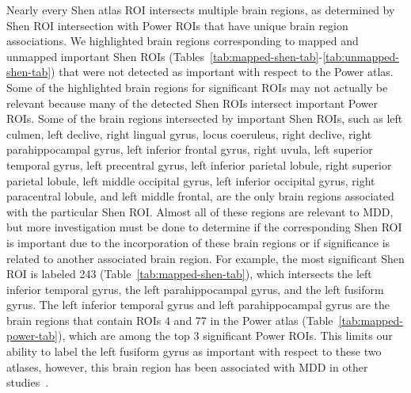 \documentclass[10pt,letterpaper]{article}\usepackage[]{graphicx}\usepackage[]{color}
\begin{document}
Nearly every Shen atlas ROI intersects multiple brain regions, as determined by Shen ROI intersection with Power ROIs that have unique brain region associations. We highlighted brain regions corresponding to mapped and unmapped important Shen ROIs (Tables~\ref{tab:mapped-shen-tab}-\ref{tab:unmapped-shen-tab}) that were not detected as important with respect to the Power atlas. Some of the highlighted brain regions for significant ROIs may not actually be relevant because many of the detected Shen ROIs intersect important Power ROIs. Some of the brain regions intersected by important Shen ROIs, such as left culmen, left declive, right lingual gyrus, locus coeruleus, right declive, right parahippocampal gyrus, left inferior frontal gyrus, right uvula, left superior temporal gyrus, left precentral gyrus, left inferior parietal lobule, right superior parietal lobule, left middle occipital gyrus, left inferior occipital gyrus, right paracentral lobule, and left middle frontal, are the only brain regions associated with the particular Shen ROI. Almost all of these regions are relevant to MDD, but more investigation must be done to determine if the corresponding Shen ROI is important due to the incorporation of these brain regions or if significance is related to another associated brain region. For example, the most significant Shen ROI is labeled 243 (Table~\ref{tab:mapped-shen-tab}), which intersects the left inferior temporal gyrus, the left parahippocampal gyrus, and the left fusiform gyrus. The left inferior temporal gyrus and left parahippocampal gyrus are the brain regions that contain ROIs 4 and 77 in the Power atlas (Table~\ref{tab:mapped-power-tab}), which are among the top 3 significant Power ROIs. This limits our ability to label the left fusiform gyrus as important with respect to these two atlases, however, this brain region has been associated with MDD in other studies~\cite{iwabuchi2015,kroes2011}. 
\end{document}
